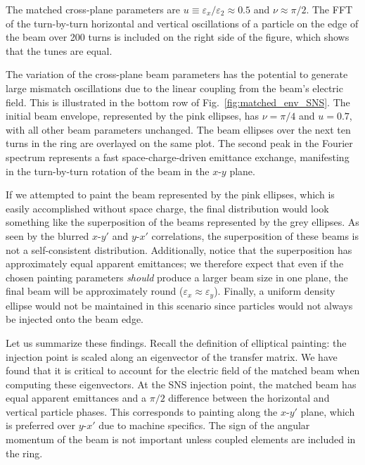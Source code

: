 %
The matched cross-plane parameters are $u \equiv \varepsilon_x / \varepsilon_2 \approx 0.5$ and $\nu \approx \pi / 2$. The FFT of the turn-by-turn horizontal and vertical oscillations of a particle on the edge of the beam over 200 turns is included on the right side of the figure, which shows that the tunes are equal. 

The variation of the cross-plane beam parameters has the potential to generate large mismatch oscillations due to the linear coupling from the beam's electric field. This is illustrated in the bottom row of Fig.~\ref{fig:matched_env_SNS}. The initial beam envelope, represented by the pink ellipses, has $\nu = \pi / 4$ and $u = 0.7$, with all other beam parameters unchanged. The beam ellipses over the next ten turns in the ring are overlayed on the same plot. The second peak in the Fourier spectrum represents a fast space-charge-driven emittance exchange, manifesting in the turn-by-turn rotation of the beam in the $x$-$y$ plane. 

If we attempted to paint the beam represented by the pink ellipses, which is easily accomplished without space charge, the final distribution would look something like the superposition of the beams represented by the grey ellipses. As seen by the blurred $x$-$y'$ and $y$-$x'$ correlations, the superposition of these beams is not a self-consistent distribution. Additionally, notice that the superposition has approximately equal apparent emittances; we therefore expect that even if the chosen painting parameters \textit{should} produce a larger beam size in one plane, the final beam will be approximately round ($\varepsilon_x \approx \varepsilon_y$). Finally, a uniform density ellipse would not be maintained in this scenario since particles would not always be injected onto the beam edge. 

Let us summarize these findings. Recall the definition of elliptical painting: the injection point is scaled along an eigenvector of the transfer matrix. We have found that it is critical to account for the electric field of the matched beam when computing these eigenvectors. At the SNS injection point, the matched beam has equal apparent emittances and a $\pi / 2$ difference between the horizontal and vertical particle phases. This corresponds to painting along the $x$-$y'$ plane, which is preferred over $y$-$x'$ due to machine specifics. The sign of the angular momentum of the beam is not important unless coupled elements are included in the ring. 


